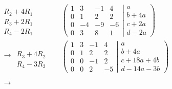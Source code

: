 \begin{align*}
\begin{array}{l}
   \\
 R_2 + 4R_1 \\
 R_3 + 2R_1 \\
 R_4 - 2R_1
\end{array}
&\quad
\left(
	\begin{matrix}
	   1 &   3 & -1 &   4 \\
	   0 &   1 &  2 &   2 \\
	   0 &  -4 & -9 &  -6 \\
	   0 &   3 &  8 &   1
	\end{matrix}
  \left|
	\begin{matrix}
	  a \\
	  b+4a \\
	  c+2a \\
	  d-2a
	\end{matrix}
  \right.
\right)
\\
\begin{array}{l}
   \\
 \longrightarrow \\
   \\
\end{array}
\begin{array}{l}
  \\
  \\
 R_3 + 4R_2 \\
 R_4 - 3R_2
\end{array}
&\quad
\left(
	\begin{matrix}
	   1 &   3 & -1 &   4 \\
	   0 &   1 &  2 &   2 \\
	   0 &   0 & -1 &   2 \\
	   0 &   0 &  2 &  -5
	\end{matrix}
  \left|
	\begin{matrix}
	  a \\
	  b+4a \\
	  c+18a+4b \\
	  d-14a-3b
	\end{matrix}
  \right.
\right)
\\
\begin{array}{l}
   \\
 \longrightarrow \\
   \\
\end{array}
\begin{array}{l}

\end{array}
\end{align*}
